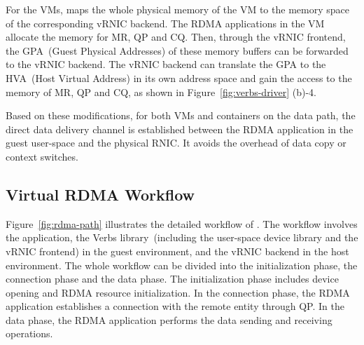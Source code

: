 For the VMs, \sys maps the whole physical memory of the VM to the memory space of the corresponding vRNIC backend.
The RDMA applications in the VM allocate the memory for MR, QP and CQ. Then, through the vRNIC frontend, the GPA~(Guest Physical Addresses) of these memory buffers can be forwarded to the vRNIC backend. The vRNIC backend can translate the GPA to the HVA~(Host Virtual Address) in its own address space and gain the access to the memory of MR, QP and CQ, as shown in Figure~\ref{fig:verbs-driver} (b)-4.


Based on these modifications, for both VMs and containers on the data path, the direct data delivery channel is established between the RDMA application in the guest user-space and the physical RNIC. It avoids the overhead of data copy or context switches.


\subsection{Virtual RDMA Workflow}


Figure~\ref{fig:rdma-path} illustrates the detailed workflow of \sys. The workflow involves the application, the Verbs library~(including the user-space device library and the vRNIC frontend) in the guest environment, and the vRNIC backend in the host environment.
The whole workflow can be divided into the initialization phase, the connection phase and the data phase. The initialization phase includes device opening and RDMA resource initialization.
In the connection phase, the RDMA application establishes a connection with the remote entity through QP.
In the data phase, the RDMA application performs the data sending and receiving operations.

